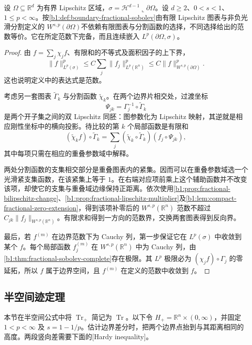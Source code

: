 \begin{proposition}\label{b1:prop:trace-chart-independence}
设 \(\Omega\subseteq\mathbb R^d\) 为有界 Lipschitz 区域，\(\sigma=\mathcal H^{d-1}\llcorner\partial\Omega\)。设 \(d\geq2\)、\(0<s<1\)、\(1\leq p<\infty\)。按\cref{b1:def:boundary-fractional-sobolev}由有限 Lipschitz 图表与非负光滑分割定义的 \(W^{s,p}(\partial\Omega)\)不依赖有限图表与分割函数的选择，不同选择给出的范数等价。它在所定范数下完备，而且连续嵌入 \(L^p(\partial\Omega,\sigma)\)。
\end{proposition}
\begin{proof}
由 \(f=\sum_j\chi_j f\)、有限和的不等式及面积因子的上下界，
\[
 \|f\|_{L^p(\sigma)}^p
 \le C\sum_j\|f_j\|_{L^p(\mathbb R^n)}^p
 \le C\|f\|_{W^{s,p}(\partial\Omega)}^p.
\]
这也说明定义中的表达式是范数。

考虑另一套图表 \(\widetilde\Gamma_k\) 与分割函数 \(\widetilde\chi_k\)。在两个边界片相交处，过渡坐标
\[
 \Psi_{jk}=\Gamma_j^{-1}\circ\widetilde\Gamma_k
\]
是两个开子集之间的双 Lipschitz 同胚：图参数化为 Lipschitz 映射，其逆就是相应刚性坐标中的横向投影。待比较的第 \(k\) 个局部函数是有限和
\[
 (\widetilde\chi_k f)\circ\widetilde\Gamma_k
 =\sum_j
   (\widetilde\chi_k\circ\widetilde\Gamma_k)(f_j\circ\Psi_{jk}),
\]
其中每项只需在相应的重叠参数域中解释。

两处分割函数的支集相交部分是重叠图表内的紧集。因而可以在重叠参数域选一个光滑紧支集函数，在该紧集上等于 \(1\)。在右端对应项前乘上这个辅助函数并不改变该项，却使它的支集与重叠域边缘保持正距离。依次使用\cref{b1:prop:fractional-bilipschitz-change}、\cref{b1:prop:fractional-lipschitz-multiplier}及\cref{b1:lem:compact-fractional-zero-extension}，得到该项补零后的 \(W^{s,p}(\mathbb R^n)\) 范数不超过 \(C_{jk}\|f_j\|_{W^{s,p}(\mathbb R^n)}\)。有限求和得到一方向的范数界，交换两套图表得到反向界。

最后，若 \(f^{(m)}\) 在边界范数下为 Cauchy 列，第一步保证它在 \(L^p(\sigma)\) 中收敛到某个 \(f\)。每个局部函数 \(f_j^{(m)}\) 在 \(W^{s,p}(\mathbb R^n)\) 中为 Cauchy 列，由\cref{b1:thm:fractional-sobolev-complete}存在极限。其 \(L^p\) 极限必为 \((\chi_j f)\circ\Gamma_j\) 的零延拓，所以 \(f\) 属于边界空间，且 \(f^{(m)}\) 在定义的范数中收敛到 \(f\)。
\end{proof}

\subsection{半空间迹定理}
\label{b1:subsec:230302}

本节在半空间公式中将 \(\operatorname{Tr}_+\) 简记为 \(\operatorname{Tr}\)。以下令 \(H_+=\mathbb R^n\times(0,\infty)\)，并固定 \(1<p<\infty\) 及 \(s=1-1/p\)。估计边界差分时，把两个边界点抬到与其距离相同的高度。两段竖向差需要下面的[Hardy inequality]。

